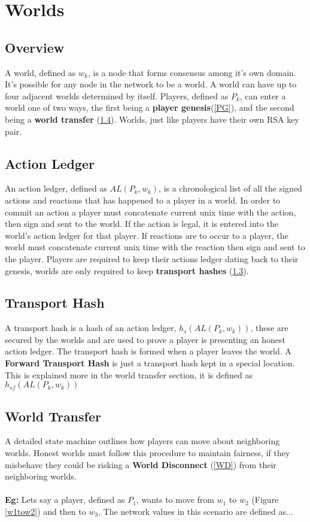 \documentclass[runningheads,a4paper]{llncs}
\begin{document}
\section{Worlds}
\subsection{Overview}
A world, defined as $w_k$, is a node that forms consensus among it's own domain. It's possible for any node in the network to be a world. A world can have up to four adjacent worlds determined by itself. Players, defined as $P_k$, can enter a world one of two ways, the first being a \textbf{player genesis}(\ref{PG}), and the second being a \textbf{world transfer} (\ref{WT}). Worlds, just like players have their own RSA key pair. 

\subsection{Action Ledger}
\label{AL}
An action ledger, defined as $AL(P_{k}, w_k)$, is a chronological list of all the signed actions and reactions that has happened to a player in a world. In order to commit an action a player must concatenate current unix time with the action, then sign and sent to the world. If the action is legal, it is entered into the world's action ledger for that player. If reactions are to occur to a player, the world must concatenate current unix time with the reaction then sign and sent to the player. Players are required to keep their actions ledger dating back to their genesis, worlds are only required to keep \textbf{transport hashes} (\ref{TH}).

\subsection{Transport Hash}
\label{TH}
A transport hash is a hash of an action ledger, $h_s(AL(P_{k}, w_k))$, these are secured by the worlds and are used to prove a player is presenting an honest action ledger. The transport hash is formed when a player leaves the world. A \textbf{Forward Transport Hash} is just a transport hash kept in a special location. This is explained more in the world transfer section, it is defined as  $h_{sf}(AL(P_{k}, w_k))$

\subsection{World Transfer} 
\label{WT}
A detailed state machine outlines how players can move about neighboring worlds. Honest worlds must follow this procedure to maintain fairness, if they misbehave they could be risking a \textbf{World Disconnect} (\ref{WD}) from their neighboring worlds. 
\\
\\
\textbf{Eg:} Lets say a player, defined as $P_1$, wants to move from $w_1$ to $w_2$ (Figure \ref{w1tow2}) and then to $w_3$, The network values in this scenario are defined as...
\end{document}
